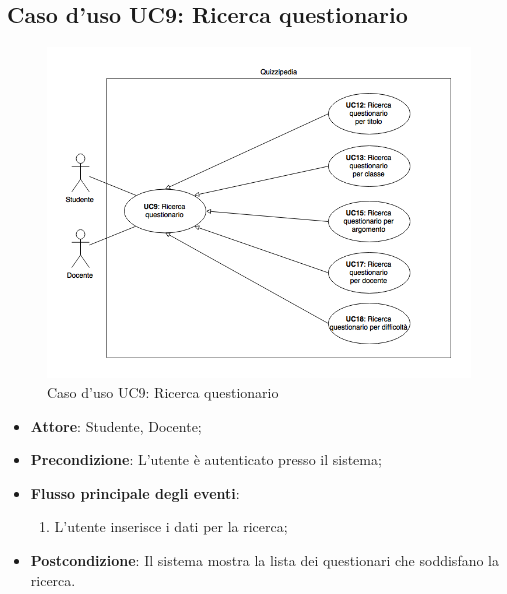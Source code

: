 \documentclass[12pt,a4paper]{article}
\begin{document}
\subsection{Caso d'uso UC9: Ricerca questionario}
\begin{figure}[H]
	\centering
	\includegraphics[width=\textwidth]{../img/diagramUC9.png}
	\caption{Caso d'uso UC9: Ricerca questionario}\label{fig:UC9} 
\end{figure}
\begin{itemize}

\item \textbf{Attore}: Studente, Docente; 
\item \textbf{Precondizione}: L'utente è autenticato presso il sistema;

\item \textbf{Flusso principale degli eventi}:
\begin{enumerate}
	\item L'utente inserisce i dati per la ricerca;
	
\end{enumerate}
\item \textbf{Postcondizione}: Il sistema mostra la lista dei questionari che soddisfano la ricerca.
\end{itemize}
\hypertarget{UC10}{}
\end{document}
